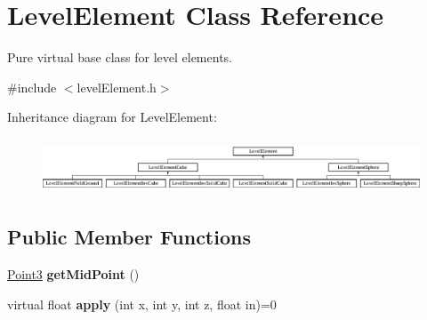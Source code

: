 \hypertarget{classLevelElement}{
\section{\-Level\-Element \-Class \-Reference}
\label{d3/d59/classLevelElement}
}


\-Pure virtual base class for level elements.  




{\ttfamily \#include $<$level\-Element.\-h$>$}

\-Inheritance diagram for \-Level\-Element\-:\begin{figure}[H]
\begin{center}
\leavevmode
\includegraphics[height=1.647059cm]{d3/d59/classLevelElement}
\end{center}
\end{figure}
\subsection*{\-Public \-Member \-Functions}
\begin{DoxyCompactItemize}
\item 
\hypertarget{classLevelElement_afc2a68aaee3f8ab5813422c653b93979}{
\hyperlink{classPoint3}{\-Point3} {\bfseries get\-Mid\-Point} ()}
\label{d3/d59/classLevelElement_afc2a68aaee3f8ab5813422c653b93979}

\item 
\hypertarget{classLevelElement_ad8d9debc1ac4a63c67a677ee7b957463}{
virtual float {\bfseries apply} (int x, int y, int z, float in)=0}
\label{d3/d59/classLevelElement_ad8d9debc1ac4a63c67a677ee7b957463}

\end{DoxyCompactItemize}

